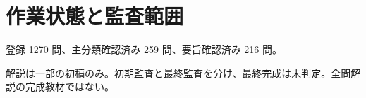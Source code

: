 \chapter{作業状態と監査範囲}
登録 1270 問、主分類確認済み 259 問、要旨確認済み 216 問。
\par 解説は一部の初稿のみ。初期監査と最終監査を分け、最終完成は未判定。全問解説の完成教材ではない。
